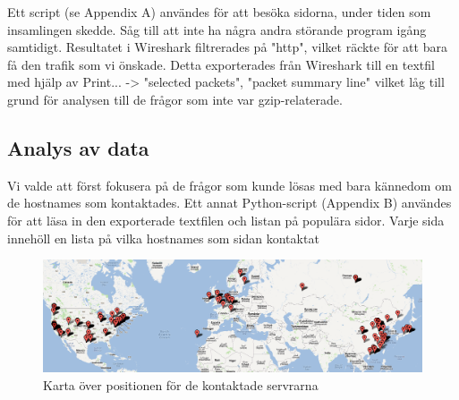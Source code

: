 \documentclass[a4paper]{article}
\begin{document}
Ett script (se Appendix A) användes för att besöka sidorna, under tiden som insamlingen skedde. Såg till att inte ha några andra störande program igång samtidigt. Resultatet i Wireshark filtrerades på "http", vilket räckte för att bara få den trafik som vi önskade. Detta exporterades från Wireshark till en textfil med hjälp av Print... -> "selected packets", "packet summary line" vilket låg till grund för analysen till de frågor som inte var gzip-relaterade.


\subsection{Analys av data}
Vi valde att först fokusera på de frågor som kunde lösas med bara kännedom om de hostnames som kontaktades. Ett annat Python-script (Appendix B) användes för att läsa in den exporterade textfilen och listan på populära sidor. Varje sida innehöll en lista på vilka hostnames som sidan kontaktat

\begin{figure}[h]
\centering
\includegraphics[keepaspectratio,width=\textwidth]{map}
\caption{Karta över positionen för de kontaktade servrarna}
\label{fig:gc}
\end{figure}
\end{document}
